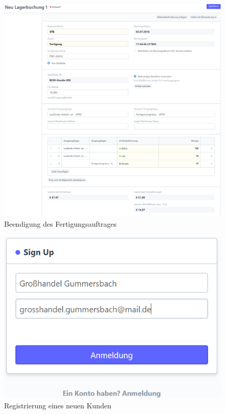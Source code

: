 \begin{figure}
  \centering
  \includegraphics[width=\textwidth]{Bilder/Lagerbuchung2.PNG}
  \caption{Beendigung des Fertigungsauftrages}
  \label{fig:beenFertig}
\end{figure}
\begin{figure}
  \centering
  \includegraphics[width=\textwidth]{Bilder/Registrierung.PNG}
  \caption{Registrierung eines neuen Kunden}
  \label{fig:regKunde}
\end{figure}
